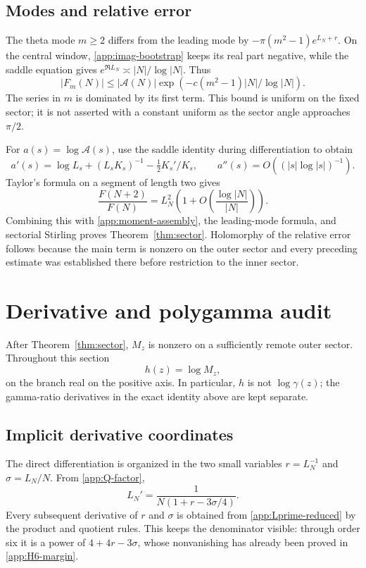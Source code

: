 \subsection{Modes and relative error}

The theta mode $m\ge2$ differs from the leading mode by
$-\pi(m^2-1)e^{L_N+r}$.  On the central window,
\eqref{app:imag-bootstrap} keeps its real part negative, while the saddle
equation gives $e^{\Re L_N}\asymp |N|/\log|N|$.  Thus
\begin{equation}\label{app:mode-suppression}
 |F_m(N)|\le|\mathcal A(N)|
 \exp\left(-c(m^2-1)|N|/\log|N|\right).
\end{equation}
The series in $m$ is dominated by its first term.  This bound is uniform on
the fixed sector; it is not asserted with a constant uniform as the sector
angle approaches $\pi/2$.

For $a(s)=\log\mathcal A(s)$, use the saddle identity during
differentiation to obtain
\[
 a'(s)=\log L_s+(L_sK_s)^{-1}-\tfrac12K_s'/K_s,
 \qquad a''(s)=O((|s|\log|s|)^{-1}).
\]
Taylor's formula on a segment of length two gives
\[
 \frac{F(N+2)}{F(N)}=L_N^2
 \left(1+O\left(\frac{\log|N|}{|N|}\right)\right).
\]
Combining this with \eqref{app:moment-assembly}, the leading-mode formula,
and sectorial Stirling proves Theorem~\ref{thm:sector}.  Holomorphy of the
relative error follows because the main term is nonzero on the outer sector
and every preceding estimate was established there before restriction to
the inner sector.

\section{Derivative and polygamma audit}\label{app:derivative-audit}

After Theorem~\ref{thm:sector}, $M_z$ is nonzero on a sufficiently remote
outer sector.  Throughout this section
\[
 h(z)=\log M_z,
\]
on the branch real on the positive axis.  In particular, $h$ is not
$\log\gamma(z)$; the gamma-ratio derivatives in the exact identity above are
kept separate.

\subsection{Implicit derivative coordinates}

The direct differentiation is organized in the two small variables
$r=L_N^{-1}$ and $\sigma=L_N/N$.  From \eqref{app:Q-factor},
\begin{equation}\label{app:Lprime-reduced}
 L_N'=\frac{1}{N(1+r-3\sigma/4)}.
\end{equation}
Every subsequent derivative of $r$ and $\sigma$ is obtained from
\eqref{app:Lprime-reduced} by the product and quotient rules.  This keeps the
denominator visible: through order six it is a power of
$4+4r-3\sigma$, whose nonvanishing has already been proved in
\eqref{app:H6-margin}.

